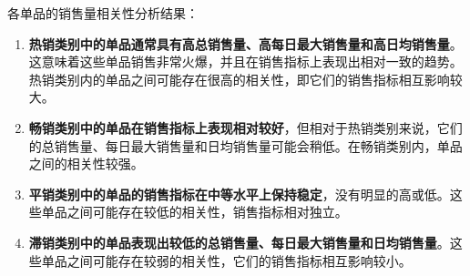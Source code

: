 \documentclass{article}
\begin{document}
	各单品的销售量相关性分析结果：
	
	\begin{enumerate}[label=\Roman*.]
		\item \textbf{热销类别中的单品通常具有高总销售量、高每日最大销售量和高日均销售量}。这意味着这些单品销售非常火爆，并且在销售指标上表现出相对一致的趋势。热销类别内的单品之间可能存在很高的相关性，即它们的销售指标相互影响较大。
		
		\item \textbf{畅销类别中的单品在销售指标上表现相对较好}，但相对于热销类别来说，它们的总销售量、每日最大销售量和日均销售量可能会稍低。在畅销类别内，单品之间的相关性较强。
		
		\item \textbf{平销类别中的单品的销售指标在中等水平上保持稳定}，没有明显的高或低。这些单品之间可能存在较低的相关性，销售指标相对独立。
		
		\item \textbf{滞销类别中的单品表现出较低的总销售量、每日最大销售量和日均销售量}。这些单品之间可能存在较弱的相关性，它们的销售指标相互影响较小。
	\end{enumerate}
	
	
\end{document}
